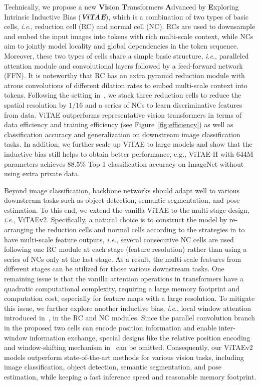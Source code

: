 \documentclass[twocolumn]{svjour3}          \smartqed  \usepackage{natbib}
\newcommand{\ie}{i.e}
\def\onedot{.\xspace}
\def\ie{\emph{i.e}\onedot}
\begin{document}
Technically, we propose a new \textbf{Vi}sion \textbf{T}ransformers \textbf{A}dvanced by \textbf{E}xploring Intrinsic Inductive Bias (\textit{\textbf{ViTAE}}), which is a combination of two types of basic cells, \ie, reduction cell (RC) and normal cell (NC). RCs are used to downsample and embed the input images into tokens with rich multi-scale context, while NCs aim to jointly model locality and global dependencies in the token sequence. Moreover, these two types of cells share a simple basic structure, \ie, paralleled attention module and convolutional layers followed by a feed-forward network (FFN). It is noteworthy that RC has an extra pyramid reduction module with atrous convolutions of different dilation rates to embed multi-scale context into tokens. Following the setting in~\citep{yuan2021tokens}, we stack three reduction cells to reduce the spatial resolution by $1/16$ and a series of NCs to learn discriminative features from data. ViTAE outperforms representative vision transformers in terms of data efficiency and training efficiency (see Figure~\ref{fig:efficiency}) as well as classification accuracy and generalization on downstream image classification tasks. In addition, we further scale up ViTAE to large models and show that the inductive bias still helps to obtain better performance, e.g., ViTAE-H with 644M parameters achieves 88.5\% Top-1 classification accuracy on ImageNet without using extra private data.

Beyond image classification, backbone networks should adapt well to various downstream tasks such as object detection, semantic segmentation, and pose estimation. To this end, we extend the vanilla ViTAE to the multi-stage design, \ie, ViTAEv2. Specifically, a natural choice is to construct the model by re-arranging the reduction cells and normal cells according to the strategies in \citep{wang2021pyramid,liu2021swin} to have multi-scale feature outputs, \ie, several consecutive NC cells are used following one RC module at each stage (feature resolution) rather than using a series of NCs only at the last stage. As a result, the multi-scale features from different stages can be utilized for those various downstream tasks. One remaining issue is that the vanilla attention operations in transformers have a quadratic computational complexity, requiring a large memory footprint and computation cost, especially for feature maps with a large resolution. To mitigate this issue, we further explore another inductive bias, \ie, local window attention introduced in~\citep{liu2021swin}, in the RC and NC modules. Since the parallel convolution branch in the proposed two cells can encode position information and enable inter-window information exchange, special designs like the relative position encoding and window-shifting mechanism in~\citep{liu2021swin} can be omitted. Consequently, our ViTAEv2 models outperform state-of-the-art methods for various vision tasks, including image classification, object detection, semantic segmentation, and pose estimation, while keeping a fast inference speed and reasonable memory footprint.
\end{document}

